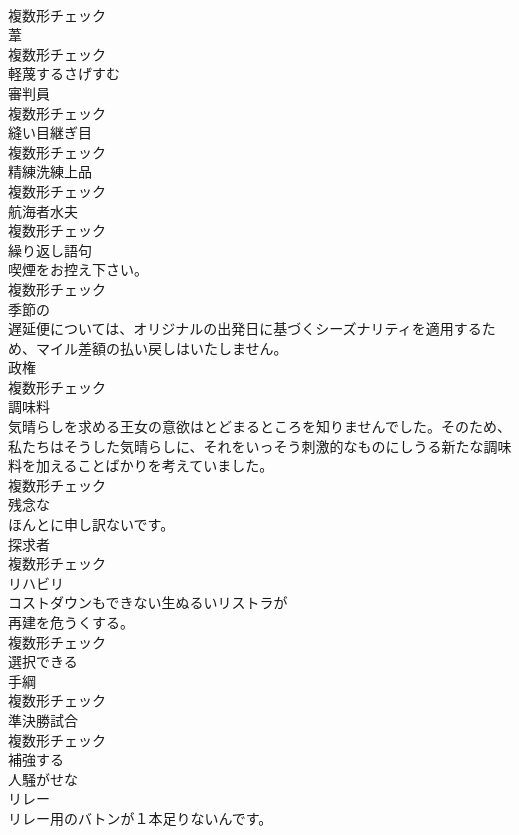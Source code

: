 \documentclass[8pt]{extreport}
\begin{document}
\begin{CJK}{UTF8}{min}
\\	複数形チェック
\\	[名詞]	葦	
\\	複数形チェック
\\	[形容詞]	軽蔑するさげすむ	
\\	[名詞]	審判員	
\\	複数形チェック
\\	[名詞]	縫い目継ぎ目	
\\	複数形チェック
\\	[名詞]	精練洗練上品	
\\	複数形チェック
\\	[名詞]	航海者水夫	
\\	複数形チェック
\\	[名詞]	繰り返し語句	
\\	喫煙をお控え下さい。	
\\	複数形チェック
\\	[形容詞]	季節の	
\\	遅延便については、オリジナルの出発日に基づくシーズナリティを適用するため、マイル差額の払い戻しはいたしません。	
\\	[名詞]	政権	
\\	複数形チェック
\\	[名詞]	調味料	
\\	気晴らしを求める王女の意欲はとどまるところを知りませんでした。そのため、私たちはそうした気晴らしに、それをいっそう刺激的なものにしうる新たな調味料を加えることばかりを考えていました。	
\\	複数形チェック
\\	[形容詞]	残念な	
\\	ほんとに申し訳ないです。	
\\	[名詞]	探求者	
\\	複数形チェック
\\	[名詞]	リハビリ	
\\	コストダウンもできない生ぬるいリストラが
\\	再建を危うくする。	
\\	複数形チェック
\\	[形容詞]	選択できる	
\\	[名詞]	手綱	
\\	複数形チェック
\\	[名詞]	準決勝試合	
\\	複数形チェック
\\	[動詞]	補強する	
\\	[形容詞]	人騒がせな	
\\	[名詞]	リレー	
\\	リレー用のバトンが１本足りないんです。	

\end{CJK}
\end{document}
